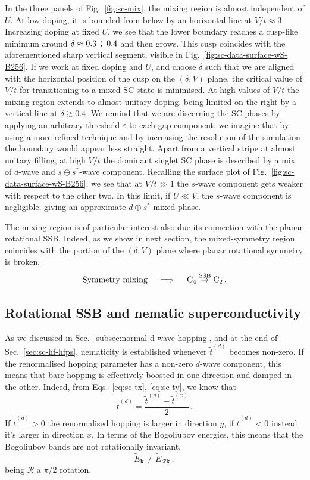 In the three panels of Fig.~\ref{fig:sc-mix}, the mixing region is almost independent of $U$. At low doping, it is bounded from below by an horizontal line at $V/t \approx 3$. Increasing doping at fixed $U$, we see that the lower boundary reaches a cusp-like minimum around $\delta \approx 0.3 \divisionsymbol 0.4$ and then grows. This cusp coincides with the aforementioned sharp vertical segment, visible in Fig.~\ref{fig:sc-data-surface-wS-B256}. If we work at fixed doping and $U$, and choose $\delta$ such that we are aligned with the horizontal position of the cusp on the $(\delta,V)$ plane, the critical value of $V/t$ for transitioning to a mixed SC state is minimised. At high values of $V/t$ the mixing region extends to almost unitary doping, being limited on the right by a vertical line at $\delta \gtrsim 0.4$. We remind that we are discerning the SC phases by applying an arbitrary threshold $\varepsilon$ to each gap component: we imagine that by using a more refined technique and by increasing the resolution of the simulation the boundary would appear less straight. Apart from a vertical stripe at almost unitary filling, at high $V/t$ the dominant singlet SC phase is described by a mix of $d$-wave and $s \oplus s^*$-wave component. Recalling the surface plot of Fig.~\ref{fig:sc-data-surface-wS-B256}, we see that at $V/t \gg 1$ the $s$-wave component gets weaker with respect to the other two. In this limit, if $U \ll V$, the $s$-wave component is negligible, giving an approximate $d \oplus s^*$ mixed phase. 

The mixing region is of particular interest also due its connection with the planar rotational SSB. Indeed, as we show in next section, the mixed-symmetry region coincides with the portion of the $(\delta,V)$ plane where planar rotational symmetry is broken,
\[
	\text{Symmetry mixing}
	\quad\implies\quad
	\mathrm{C}_4 \stackrel{\mathrm{SSB}}{\to} \mathrm{C}_2 \, .
\]

\subsection{Rotational SSB and nematic superconductivity}

As we discussed in Sec.~\ref{subsec:normal-d-wave-hopping}, and at the end of Sec.~\ref{sec:sc-hf-hfps}, nematicity is established whenever $\tilde{t}^{(d)}$ becomes non-zero. If the renormalised hopping parameter has a non-zero $d$-wave component, this means that bare hopping is effectively boosted in one direction and damped in the other. Indeed, from Eqs.~\eqref{eq:sc-tx}, \eqref{eq:sc-ty}, we know that
\[
	\tilde{t}^{(d)} = \frac{\tilde{t}^{(y)} - \tilde{t}^{(x)}}{2} \, .
\]
If $\tilde{t}^{(d)}>0$ the renormalised hopping is larger in direction $y$, if $\tilde{t}^{(d)}<0$ instead it's larger in direction $x$. In terms of the Bogoliubov energies, this means that the Bogoliubov bands are not rotationally invariant,
\[
	\tilde{E}_\mathbf{k} \neq \tilde{E}_{\mathcal{R}\mathbf{k}} \, ,
\]
being $\mathcal{R}$ a $\pi/2$ rotation.

